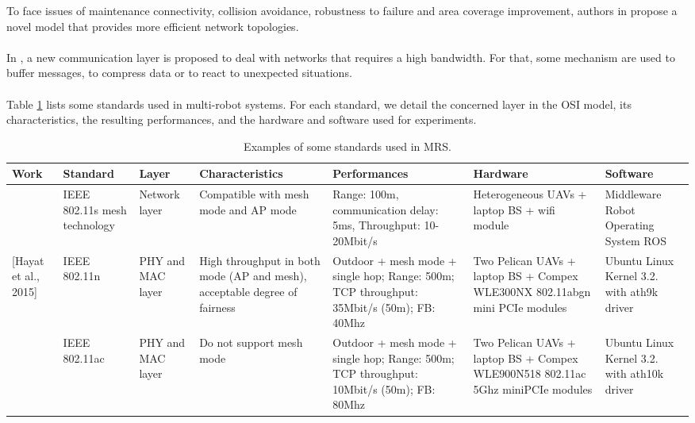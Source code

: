 \documentclass[11pt,openany]{book}
\begin{document}
To face issues of maintenance connectivity, collision avoidance, robustness to failure and area coverage improvement, authors in \cite{ghedini2018toward} propose a novel model that provides more eﬃcient network topologies.\\\\
In \cite{harms2017development}, a new communication layer is proposed to deal with networks that requires a high bandwidth. For that, some mechanism are used to buﬀer messages, to compress data or to react to unexpected situations.\\\\
Table \ref{tab:4.3} lists some standards used in multi-robot systems. For each standard, we detail the concerned layer in the OSI model, its characteristics, the resulting performances, and the hardware and software used for experiments.
\begin{landscape}
    \begin{table}[H]
        \centering
        \caption{Examples of some standards used in MRS.}
        \label{tab:4.3}
        \begin{tabular}{|p{1.5cm}|p{1.7cm}|p{1.3cm}|p{2.9cm}|p{2.7cm}|p{2.3cm}|p{2cm}|}\hline
            \textbf{Work}                             & \textbf{Standard}            & \textbf{Layer}    & \textbf{Characteristics}                                                  & \textbf{Performances}                                                                    & \textbf{Hardware}                                                               & \textbf{Software}
            \\\hline
            [Scherer et al., 2015]                    & IEEE 802.11s mesh technology & Network layer     & Compatible with mesh mode and AP mode                                     & Range: 100m, communication delay: 5ms, Throughput: 10-20Mbit/s                           & Heterogeneous UAVs + laptop BS + wifi module                                    & Middleware Robot Operating System ROS       \\\hline
            \multirow{2}{1.5cm}{[Hayat et al., 2015]} & IEEE 802.11n                 & PHY and MAC layer & High throughput in both mode (AP and mesh), acceptable degree of fairness & Outdoor + mesh mode + single hop; Range: 500m; TCP throughput: 35Mbit/s (50m); FB: 40Mhz & Two Pelican UAVs + laptop BS + Compex WLE300NX 802.11abgn mini PCIe modules     & Ubuntu Linux Kernel 3.2. with ath9k driver  \\\cline{2-7}
                                                      & IEEE 802.11ac                & PHY and MAC layer & Do not support mesh mode                                                  & Outdoor + mesh mode + single hop; Range: 500m; TCP throughput: 10Mbit/s (50m); FB: 80Mhz & Two Pelican UAVs + laptop BS + Compex WLE900N518 802.11ac 5Ghz miniPCIe modules & Ubuntu Linux Kernel 3.2. with ath10k driver \\\hline
        \end{tabular}
    \end{table}
\end{landscape}
\end{document}
